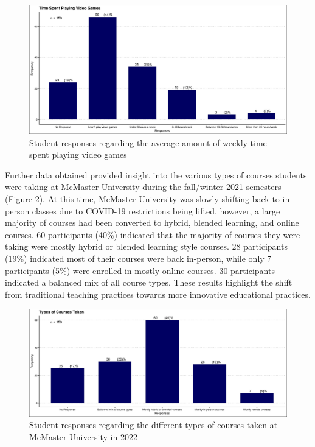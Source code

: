 \documentclass[10pt]{article}
\providecommand{\figref}[1]{(Figure \ref{#1})}  %
\begin{document}
\begin{figure}[H]
	\includegraphics[width=\textwidth]{figures_4f06/time_spent_playing_videogames.jpg}
	\caption{Student responses regarding the average amount of weekly time spent playing video games}
	\label{fig:1}
\end{figure}

Further data obtained provided insight into the various types of courses students were taking at McMaster University during the fall/winter 2021 semesters \figref{fig:2}. At this time, McMaster University was slowly shifting back to in-person classes due to COVID-19 restrictions being lifted, however, a large majority of courses had been converted to hybrid, blended learning, and online courses. 60 participants (40\%) indicated that the majority of courses they were taking were mostly hybrid or blended learning style courses. 28 participants (19\%) indicated most of their courses were back in-person, while only 7 participants (5\%) were enrolled in mostly online courses. 30 participants indicated a balanced mix of all course types. These results highlight the shift from traditional teaching practices towards more innovative educational practices.

\begin{figure}[H]
	\includegraphics[width=\textwidth]{figures_4f06/types_of_courses_taken.jpg}
	\caption{Student responses regarding the different types of courses taken at McMaster University in 2022}
	\label{fig:2}
\end{figure}
\end{document}

